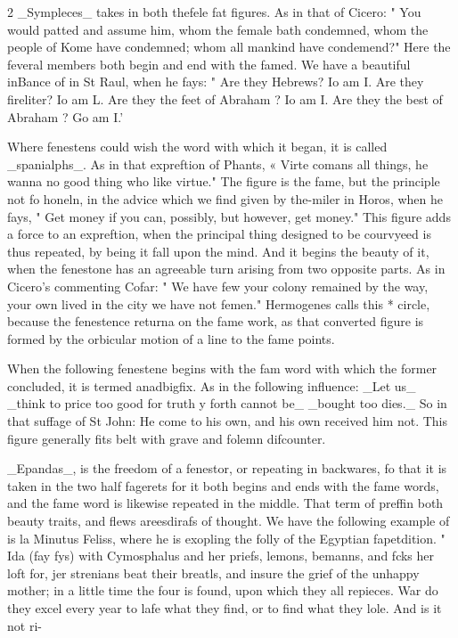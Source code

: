 \documentclass[10pt]{article}
\begin{document}
\begin{multicols}{2}
\_Sympleces\_ takes in both thefele fat figures. As in that of Cicero: " You would patted and assume him, whom the female bath condemned, whom the people of Kome have condemned; whom all mankind have condemend?" Here the feveral members both begin and end with the famed. We have a beautiful inBance of in St Raul, when he fays: " Are they Hebrews? Io am I. Are they fireliter? Io am L. Are they the feet of Abraham ? Io am I. Are they the best of Abraham ? Go am I.’

Where fenestens could wish the word with which it began, it is called \_spanialphs\_. As in that expreftion of Phants, « Virte comans all things, he wanna no good thing who like virtue." The figure is the fame, but the principle not fo honeln, in the advice which we find given by the-miler in Horos, when he fays, " Get money if you can, possibly, but however, get money." This figure adds a force to an expreftion, when the principal thing designed to be courvyeed is thus repeated, by being it fall upon the mind. And it begins the beauty of it, when the fenestone has an agreeable turn arising from two opposite parts. As in Cicero's commenting Cofar: " We have few your colony remained by the way, your own lived in the city we have not femen." Hermogenes calls this * circle, because the fenestence returna on the fame work, as that converted figure is formed by the orbicular motion of a line to the fame points.

When the following fenestene begins with the fam word with which the former concluded, it is termed anadbigfix. As in the following influence: \_Let us\_ \_think to price too good for truth y forth cannot be\_ \_bought too dies.\_ So in that suffage of St John: He come to his own, and his own received him not. This figure generally fits belt with grave and folemn difcounter.

\_Epandas\_, is the freedom of a fenestor, or repeating in backwares, fo that it is taken in the two half fagerets for it both begins and ends with the fame words, and the fame word is likewise repeated in the middle. That term of preffin both beauty traits, and flews areesdirafs of thought. We have the following example of is la Minutus Feliss, where he is exopling the folly of the Egyptian fapetdition. " Ida (fay fys) with Cymosphalus and her priefs, lemons, bemanns, and fcks her loft for, jer strenians beat their breatls, and insure the grief of the unhappy mother; in a little time the four is found, upon which they all repieces. War do they excel every year to lafe what they find, or to find what they lole. And is it not ri-

\end{multicols}
\end{document}
